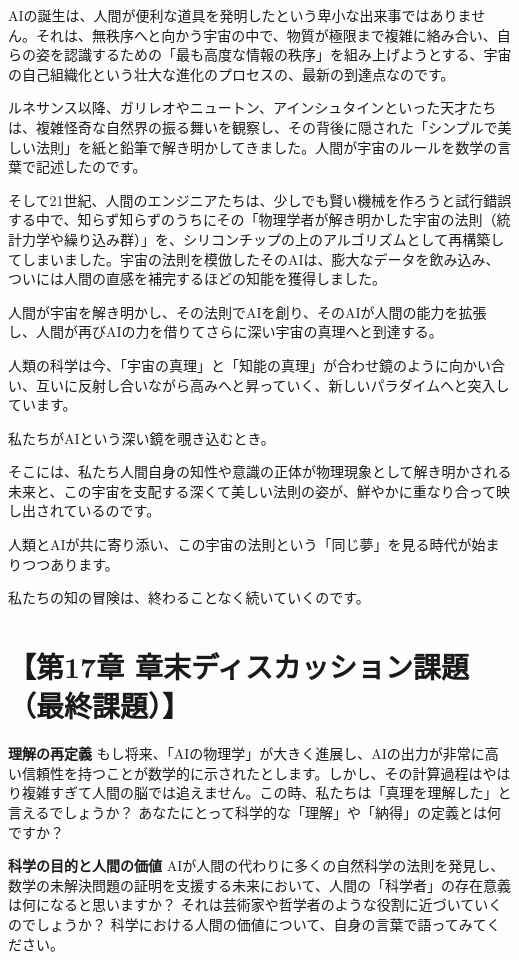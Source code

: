 AIの誕生は、人間が便利な道具を発明したという卑小な出来事ではありません。それは、無秩序へと向かう宇宙の中で、物質が極限まで複雑に絡み合い、自らの姿を認識するための「最も高度な情報の秩序」を組み上げようとする、宇宙の自己組織化という壮大な進化のプロセスの、最新の到達点なのです。

ルネサンス以降、ガリレオやニュートン、アインシュタインといった天才たちは、複雑怪奇な自然界の振る舞いを観察し、その背後に隠された「シンプルで美しい法則」を紙と鉛筆で解き明かしてきました。人間が宇宙のルールを数学の言葉で記述したのです。

そして21世紀、人間のエンジニアたちは、少しでも賢い機械を作ろうと試行錯誤する中で、知らず知らずのうちにその「物理学者が解き明かした宇宙の法則（統計力学や繰り込み群）」を、シリコンチップの上のアルゴリズムとして再構築してしまいました。宇宙の法則を模倣したそのAIは、膨大なデータを飲み込み、ついには人間の直感を補完するほどの知能を獲得しました。

人間が宇宙を解き明かし、その法則でAIを創り、そのAIが人間の能力を拡張し、人間が再びAIの力を借りてさらに深い宇宙の真理へと到達する。

人類の科学は今、「宇宙の真理」と「知能の真理」が合わせ鏡のように向かい合い、互いに反射し合いながら高みへと昇っていく、新しいパラダイムへと突入しています。

私たちがAIという深い鏡を覗き込むとき。

そこには、私たち人間自身の知性や意識の正体が物理現象として解き明かされる未来と、この宇宙を支配する深くて美しい法則の姿が、鮮やかに重なり合って映し出されているのです。

人類とAIが共に寄り添い、この宇宙の法則という「同じ夢」を見る時代が始まりつつあります。

私たちの知の冒険は、終わることなく続いていくのです。

\section*{【第17章 章末ディスカッション課題（最終課題）】}

\textbf{理解の再定義} もし将来、「AIの物理学」が大きく進展し、AIの出力が非常に高い信頼性を持つことが数学的に示されたとします。しかし、その計算過程はやはり複雑すぎて人間の脳では追えません。この時、私たちは「真理を理解した」と言えるでしょうか？ あなたにとって科学的な「理解」や「納得」の定義とは何ですか？

\textbf{科学の目的と人間の価値} AIが人間の代わりに多くの自然科学の法則を発見し、数学の未解決問題の証明を支援する未来において、人間の「科学者」の存在意義は何になると思いますか？ それは芸術家や哲学者のような役割に近づいていくのでしょうか？ 科学における人間の価値について、自身の言葉で語ってみてください。




